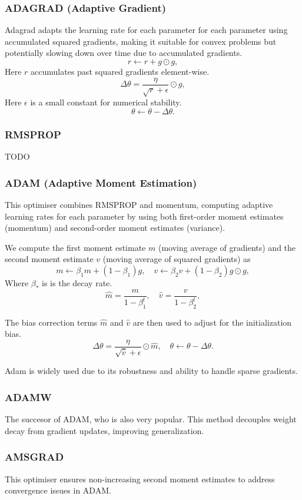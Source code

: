 \documentclass{article}
\begin{document}
\subsubsection{ADAGRAD (Adaptive Gradient)}
Adagrad adapts the learning rate for each parameter for each parameter using accumulated squared gradients, making it suitable for convex problems but potentially slowing down over time due to accumulated gradients.
\[
r \leftarrow r + g \odot g,
\]
Here $r$ accumulates past squared gradients element-wise.
\[
\Delta \theta = \frac{\eta}{\sqrt{r} + \epsilon} \odot g,
\]
Here $\epsilon$ is a small constant for numerical stability.
\[
\theta \leftarrow \theta - \Delta \theta.
\]
\subsubsection{RMSPROP}

TODO 

\subsubsection{ADAM (Adaptive Moment Estimation)}
This optimiser combines RMSPROP and momentum, computing adaptive learning rates for each parameter by using both first-order moment estimates (momentum) and second-order moment estimates (variance).

We compute the first moment estimate $m$ (moving average of gradients) and the second moment estimate $v$ (moving average of squared gradients) as 
\[
m \leftarrow \beta_1 m + (1 - \beta_1) g,\quad v \leftarrow \beta_2 v + (1 - \beta_2) g \odot g,
\]
Where $\beta_*$ is is the decay rate.
\[
\hat{m} = \frac{m}{1 - \beta_1^t},\quad \hat{v} = \frac{v}{1 - \beta_2^t},
\]

The bias correction terms $\hat{m}$ and $\hat{v}$ are then used to  adjust for the initialization bias.
\[
\Delta \theta = \frac{\eta}{\sqrt{\hat{v}} + \epsilon} \odot \hat{m},\quad \theta \leftarrow \theta - \Delta \theta.
\]

Adam is widely used due to its robustness and ability to handle sparse gradients.

\subsubsection{ADAMW}
The succesor of ADAM, who is also very popular. This method decouples weight decay from gradient updates, improving generalization.

\subsubsection{AMSGRAD}
This optimiser ensures non-increasing second moment estimates to address convergence issues in ADAM.
\end{document}
